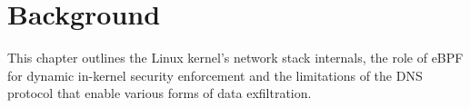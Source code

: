 \documentclass [11pt, proquest] {uwthesis}[2020/02/24]
\begin{document}

\chapter {Background}
This chapter outlines the Linux kernel’s network stack internals, the role of eBPF for dynamic in-kernel security enforcement and the limitations of the DNS protocol that enable various forms of data exfiltration.
\end{document}
